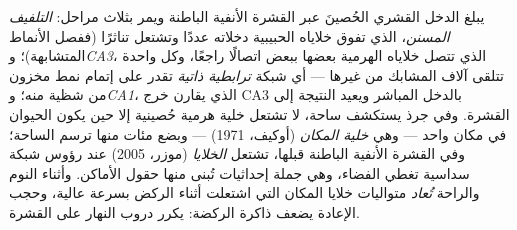 \begin{definition}\label{def:b3:learning-memory:hippocampus}
يبلغ الدخل القشري الحُصينَ عبر القشرة الأنفية الباطنة ويمر
بثلاث مراحل: \emph{التلفيف المسنن}، الذي تفوق خلاياه
الحبيبية دخلاته عددًا وتشتعل تناثرًا (ففصل الأنماط
المتشابهة)؛ و\emph{CA3}، الذي تتصل خلاياه الهرمية بعضها
ببعض اتصالًا راجعًا، وكل واحدة تتلقى آلاف المشابك من غيرها
--- أي شبكة \emph{ترابطية ذاتية} تقدر على إتمام نمط مخزون
من شظية منه؛ و\emph{CA1}، الذي يقارن خرج CA3 بالدخل المباشر
ويعيد النتيجة إلى القشرة. وفي جرذ يستكشف ساحة، لا تشتعل
خلية هرمية حُصينية إلا حين يكون الحيوان في مكان واحد ---
وهي \emph{خلية المكان} (أوكيف، 1971) --- وبضع مئات منها ترسم
الساحة؛ وفي القشرة الأنفية الباطنة قبلها، تشتعل \emph{الخلايا
} (موزر، 2005) عند رؤوس شبكة سداسية تغطي الفضاء، وهي
جملة إحداثيات تُبنى منها حقول الأماكن. وأثناء النوم والراحة
\emph{تُعاد} متواليات خلايا المكان التي اشتعلت أثناء الركض
بسرعة عالية، وحجب الإعادة يضعف ذاكرة الركضة:  يكرر
دروب النهار على القشرة.
\end{definition}

